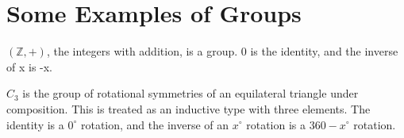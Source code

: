 \section{Some Examples of Groups}

\begin{definition}[Integers]
    \label{definition : Int}
    \leanok
    $(\mathbb{Z}, +)$, the integers with addition, is a group. $0$ is the identity,
    and the inverse of x is -x.
\end{definition}

\begin{definition}[$C_3$]
    \label{definition : C3}
    \leanok
    $C_3$ is the group of rotational symmetries of an equilateral triangle under
    composition. This is treated as an inductive type with three elements. The
    identity is a $ 0 ^{\circ} $ rotation, and the inverse of an  $x ^{\circ} $
    rotation is a $360 - x ^{\circ} $ rotation.
\end{definition}
